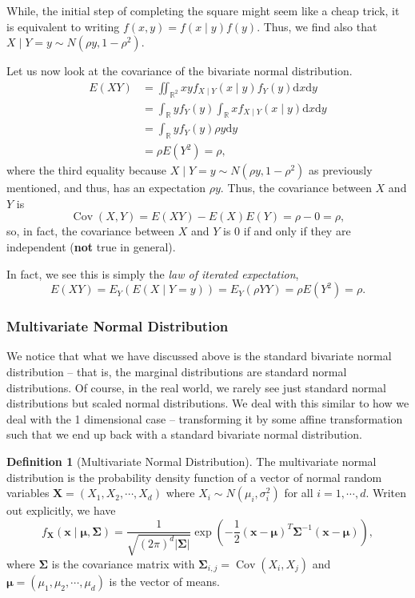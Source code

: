 \documentclass[
]{article}
\theoremstyle{definition}
\newtheorem{definition}{Definition}[section]
\begin{document}
While, the initial step of completing the square might seem like a cheap
trick, it is equivalent to writing \(f(x, y) = f(x \mid y)f(y)\). Thus,
we find also that \(X \mid Y = y \sim N(\rho y, 1 - \rho ^2)\).

Let us now look at the covariance of the bivariate normal distribution.
\begin{align*}
  E(XY) & = \iint_{\mathbb{R}^2} x y f_{X \mid Y}(x \mid y) f_Y(y)\text{d}x\text{d}y\\
        & = \int_\mathbb{R} y f_Y(y) \int_\mathbb{R} x f_{X \mid Y} (x \mid y)\text{d}x\text{d}y\\
        & = \int_\mathbb{R} y f_Y(y) \rho y \text{d}y\\
        & = \rho E(Y^2) = \rho,
\end{align*} where the third equality because
\(X \mid Y = y\sim N(\rho y, 1 - \rho ^2)\) as previously mentioned, and
thus, has an expectation \(\rho y\). Thus, the covariance between \(X\)
and \(Y\) is \[
  \mathop{\mathrm{Cov}}(X, Y) = E(XY) - E(X)E(Y) = \rho - 0 = \rho,   
\] so, in fact, the covariance between \(X\) and \(Y\) is 0 if and only
if they are independent (\textbf{not} true in general).

In fact, we see this is simply the \emph{law of iterated expectation},
\[E(XY) = E_Y(E(X \mid Y = y)) = E_Y(\rho YY) = \rho E(Y^2) = \rho.\]

\hypertarget{multivariate-normal-distribution-1}{%
\subsubsection{Multivariate Normal
Distribution}\label{multivariate-normal-distribution-1}}

We notice that what we have discussed above is the standard bivariate
normal distribution -- that is, the marginal distributions are standard
normal distributions. Of course, in the real world, we rarely see just
standard normal distributions but scaled normal distributions. We deal
with this similar to how we deal with the 1 dimensional case --
transforming it by some affine transformation such that we end up back
with a standard bivariate normal distribution.

\begin{definition}[Multivariate Normal Distribution]
  The multivariate normal distribution is the probability density function of 
  a vector of normal random variables \(\mathbf{X} = (X_1, X_2, \cdots, X_d)\) 
  where \(X_i \sim N(\mu_i, \sigma_i^2)\) for all \(i = 1,\cdots, d\). Writen 
  out explicitly, we have 
  \[
    f_\mathbf{X}(\mathbf{x} \mid \mathbf{\mu}, \mathbf{\Sigma}) = 
    \frac{1}{\sqrt{(2\pi)^d\left| \mathbf{\Sigma} \right| }}  
    \exp\left(-\frac{1}{2}(\mathbf{x} - \mathbf{\mu})^T \mathbf{\Sigma}^{-1}
    (\mathbf{x} - \mathbf{\mu})\right),
  \]
  where \(\mathbf{\Sigma}\) is the covariance matrix with 
  \(\mathbf{\Sigma}_{i, j} = \mathop{\mathrm{Cov}}(X_i, X_j)\) and \(\mathbf{\mu} = 
  (\mu_1, \mu_2, \cdots, \mu_d)\) is the vector of means.
\end{definition}
\end{document}

